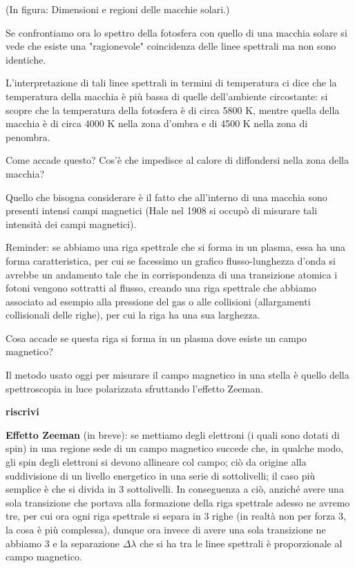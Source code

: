\vspace{0.2cm}(In figura: Dimensioni e regioni delle macchie solari.)

Se confrontiamo ora lo spettro della fotosfera con quello di una macchia solare si vede che esiste una "ragionevole" coincidenza delle linee spettrali ma non sono identiche.

L'interpretazione di tali linee spettrali in termini di temperatura ci dice che la temperatura della macchia è più bassa di quelle dell'ambiente circostante: si scopre che la temperatura della fotosfera è di circa 5800 K, mentre quella della macchia è di circa 4000 K nella zona d'ombra e di 4500 K nella zona di penombra.

Come accade questo? Cos'è che impedisce al calore di diffondersi nella zona della macchia?

Quello che bisogna considerare è il fatto che all'interno di una macchia sono presenti intensi campi magnetici (Hale nel 1908 si occupò di misurare tali intensità dei campi magnetici).

Reminder: se abbiamo una riga spettrale che si forma in un plasma, essa ha una forma caratteristica, per cui se facessimo un grafico flusso-lunghezza d'onda si avrebbe un andamento tale che in corrispondenza di una transizione atomica i fotoni vengono sottratti al flusso, creando una riga spettrale che abbiamo associato ad esempio alla pressione del gas o alle collisioni (allargamenti collisionali delle righe), per cui la riga ha una sua larghezza.

Cosa accade se questa riga si forma in un plasma dove esiste un campo magnetico?

Il metodo usato oggi per misurare il campo magnetico in una stella è quello della spettroscopia in luce polarizzata sfruttando l'effetto Zeeman.

\textbf{riscrivi}

\textbf{Effetto Zeeman} (in breve): se mettiamo degli elettroni (i quali sono dotati di spin) in una regione sede di un campo magnetico succede che, in qualche modo, gli spin degli elettroni si devono allineare col campo; ciò da origine alla suddivisione di un livello energetico in una serie di sottolivelli; il caso più semplice è che si divida in 3 sottolivelli. In conseguenza a ciò, anziché avere una sola transizione che portava alla formazione della riga spettrale adesso ne avremo tre, per cui ora ogni riga spettrale si separa in 3 righe (in realtà non per forza 3, la cosa è più complessa), dunque ora invece di avere una sola transizione ne abbiamo 3 e la separazione $\Delta \lambda$ che si ha tra le linee spettrali è proporzionale al campo magnetico.

